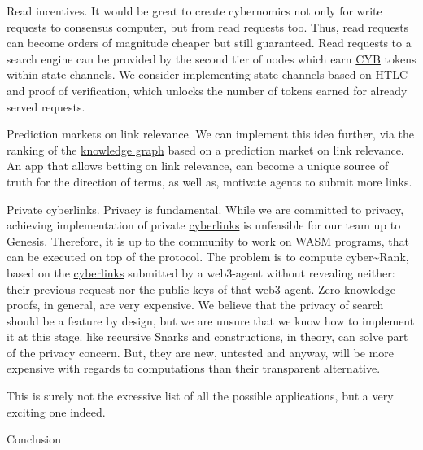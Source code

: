 \documentclass[8pt,oneside]{amsart}
\makeatletter
\newcommand{\linkgreen}[2]{\href{#1}{\color{green}{#2}}}
\renewcommand\subsection{\@startsection{subsection}
                                    {2}{\z@}
                                    {-3.25ex\@plus -1ex \@minus -.2ex}
                                    {0ex \@plus .2ex}
                                    {\play\Large}
                        }
\newcommand{\titleSection}[1]{\subsection{#1}}
\makeatother
\begin{document}
Read incentives. It would be great to create cybernomics not only for write requests to {\hyperref[consensus-computer]{consensus computer}}, but from read requests too. Thus, read requests can become orders of magnitude cheaper but still guaranteed. Read requests to a search engine can be provided by the second tier of nodes which earn {\hyperref[cyb]{CYB}} tokens within state channels. We consider implementing state channels based on HTLC and proof of verification, which unlocks the number of tokens earned for already served requests.

Prediction markets on link relevance. We can implement this idea further, via the ranking of the {\hyperref[knowledge-graph]{knowledge graph}} based on a prediction market on link relevance. An app that allows betting on link relevance, can become a unique source of truth for the direction of terms, as well as, motivate agents to submit more links.

Private cyberlinks. Privacy is fundamental. While we are committed to privacy, achieving implementation of private {\hyperref[cyberlinks]{cyberlinks}} is unfeasible for our team up to Genesis. Therefore, it is up to the community to work on WASM programs, that can be executed on top of the protocol. The problem is to compute cyber\~{}Rank, based on the {\hyperref[cyberlinks]{cyberlinks}} submitted by a web3-agent without revealing neither: their previous request nor the public keys of that web3-agent. Zero-knowledge proofs, in general, are very expensive. We believe that the privacy of search should be a feature by design, but we are unsure that we know how to implement it at this stage. \linkgreen{https://ipfs.io/ipfs/Qmdje3AmtsfjX9edWAxo3LFhV9CTAXoUvwGR7wHJXnc2Gk}{Coda} like recursive Snarks and \linkgreen{https://ipfs.io/ipfs/Qmd99xmraYip9cVv8gRMy6Y97Bkij8qUYArGDME7CzFasg}{MimbleWimble} constructions, in theory, can solve part of the privacy concern. But, they are new, untested and anyway, will be more expensive with regards to computations than their transparent alternative.

This is surely not the excessive list of all the possible applications, but a very exciting one indeed.

\titleSection{Conclusion}\label{conclusion}
\end{document}
